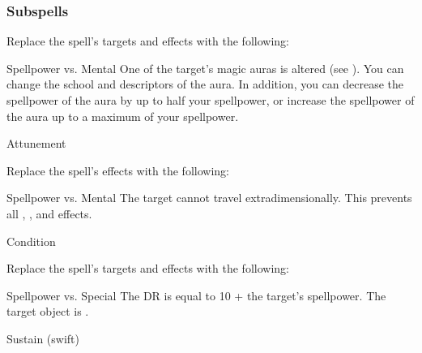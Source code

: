 \subsubsection{Subspells}
Replace the spell's targets and effects with the following:
\begin{spellcontent}
\begin{augmenttargetinginfo}
\end{augmenttargetinginfo}
\begin{augmenteffects}
\begin{spellattack}{Spellpower vs. Mental}
\spellsuccess
One of the target's magic auras is altered (see ).
You can change the school and descriptors of the aura.
In addition, you can decrease the spellpower of the aura by up to half your spellpower, or increase the spellpower of the aura up to a maximum of your spellpower.
\end{spellattack}
\spelldur Attunement
\end{augmenteffects}
\end{spellcontent}
Replace the spell's effects with the following:
\begin{spellcontent}
\begin{augmenteffects}
\begin{spellattack}{Spellpower vs. Mental}
\spellsuccess
The target cannot travel extradimensionally.
This prevents all , , and  effects.
\end{spellattack}
\spelldur Condition
\end{augmenteffects}
\end{spellcontent}
Replace the spell's targets and effects with the following:
\begin{spellcontent}
\begin{augmenttargetinginfo}
\end{augmenttargetinginfo}
\begin{augmenteffects}
\begin{spellattack}{Spellpower vs. Special}
\spellspecial
The DR is equal to 10 + the target's spellpower.
\spellsuccess
The target object is .
\end{spellattack}
\spelldur Sustain (swift)
\end{augmenteffects}
\end{spellcontent}
